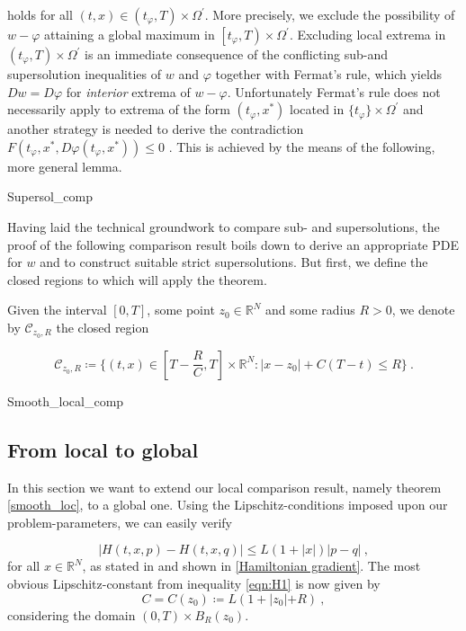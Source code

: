 		holds for all $ (t, x) \in \left( t_{\varphi}, T \right) \times\Omega^{\prime} $. More precisely, we exclude the possibility of $ w -\varphi $ attaining a global maximum in $ \left[ t_{\varphi}, T \right) \times \Omega^{\prime} $. Excluding local extrema in ${ \left( t_{\varphi}, T \right) \times \Omega^{\prime} }$ is an immediate consequence of the conflicting sub-and supersolution inequalities of $ w $ and $ \varphi $ together with Fermat's rule, which yields $ Dw = D\varphi $ for \emph{interior} extrema of $ w - \varphi $. Unfortunately Fermat's rule does not necessarily apply to extrema of the form $ (t_{\varphi}, x^{*}) $ located in $ \{t_{\varphi} \}\times \Omega^{\prime}  $ and another strategy is needed to derive the contradiction $ F(t_{\varphi}, x^{*}, D\varphi(t_\varphi, x^{*})) \leq 0 $ . This is achieved by the means of the following, more general lemma.
		
		{Supersol_comp}
	
		Having laid the technical groundwork to compare sub- and supersolutions, the proof of the following comparison result boils down to derive an appropriate PDE for $ w $ and to construct suitable strict supersolutions. But first, we define the closed regions to which will apply the theorem.
		
		\begin{definition}
			\label{regions}
			Given the interval $ \left[0, T\right] $, some point $ z_0 \in \mathbb{R}^N $ and some radius $ R > 0 $, we denote by $ \mathcal{C}_{z_0, R} $ the closed region
			
			\begin{equation*}
			\mathcal{C}_{z_0, R} \coloneqq \Bigg\{ (t, x) \in \left[ T - \frac{R}{C}, T \right] \times \mathbb{R}^N: \lvert x - z_0 \rvert + C(T-t) \leq R \Bigg\} \ .
			\end{equation*}
		\end{definition}
		
		{Smooth_local_comp}
	
	\subsection{From local to global}
		In this section we want to extend our local comparison result, namely theorem \ref{smooth_loc}, to a global one. Using the Lipschitz-conditions imposed upon our problem-parameters, we can easily verify
		
		\begin{equation}
			\label{varying_Lipschitz}
			\lvert H(t, x, p) - H(t, x, q) \rvert \leq L \left(1 + \lvert x \rvert \right) \lvert p - q \rvert \ ,
		\end{equation}
		for all $ x \in \mathbb{R}^{N} $, as stated in \cite[p.~167]{zhou} and shown in \ref{Hamiltonian gradient}. The most obvious Lipschitz-constant from inequality \eqref{eqn:H1} is now given by
		\begin{equation*}
			C = C(z_0) \coloneqq L (1 + \lvert z_0 \lvert + R) \ ,
		\end{equation*}
		considering the domain $ \left(0, T \right) \times B_R(z_0) $.
		
